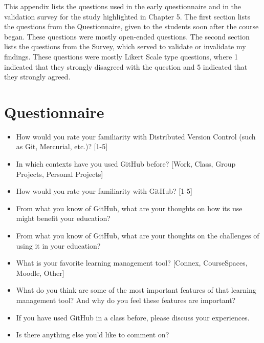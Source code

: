 This appendix lists the questions used in the early questionnaire and in the validation survey for the study highlighted in Chapter 5. The first section lists the questions from the Questionnaire, given to the students soon after the course began. These questions were mostly open-ended questions. The second section lists the questions from the Survey, which served to validate or invalidate my findings. These questions were mostly Likert Scale type questions, where 1 indicated that they strongly disagreed with the question and 5 indicated that they strongly agreed.

\section{Questionnaire}
\begin{itemize}
    \item How would you rate your familiarity with Distributed Version Control (such as Git, Mercurial, etc.)? [1-5]
    \item In which contexts have you used GitHub before? [Work, Class, Group Projects, Personal Projects]
    \item How would you rate your familiarity with GitHub? [1-5]
    \item From what you know of GitHub, what are your thoughts on how its use might benefit your education?
    \item From what you know of GitHub, what are your thoughts on the challenges of using it in your education?
    \item What is your favorite learning management tool? [Connex, CourseSpaces, Moodle, Other]
    \item What do you think are some of the most important features of that learning management tool? And why do you feel these features are important?
    \item If you have used GitHub in a class before, please discuss your experiences.
    \item Is there anything else you'd like to comment on?
\end{itemize}

